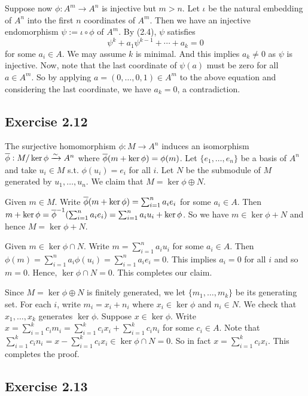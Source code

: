 \documentclass[../A&M.tex]{subfiles}
\begin{document}
Suppose now $\phi : A^m \to A^n$ is injective but $m>n$. Let $\iota$ be the natural embedding of $A^n$ into the first $n$ coordinates of $A^m$. Then we have an injective endomorphism $\psi := \iota \circ \phi$ of $A^m$. By (2.4), $\psi$ satisfies
$$
\psi^k + a_1\psi^{k-1} + \cdots + a_k = 0
$$
for some $a_i\in A$. We may assume $k$ is minimal. And this implies $a_k \neq 0$ as $\psi$ is injective. Now, note that the last coordinate of $\psi(a)$ must be zero for all $a\in A^m$. So by applying $a=(0,\ldots,0,1) \in A^m$ to the above equation and considering the last coordinate, we have $a_k = 0$, a contradiction.

\subsection*{Exercise 2.12}

The surjective homomorphism $\phi: M\to A^n$ induces an isomorphism $\overline{\phi}: M/\ker \phi \xrightarrow{\sim} A^n$ where $\overline{\phi}(m+\ker\phi) = \phi(m)$. Let $\{e_1,\ldots,e_n\}$ be a basis of $A^n$ and take $u_i\in M$ s.t. $\phi(u_i)=e_i$ for all $i$. Let $N$ be the submodule of $M$ generated by $u_1,\ldots,u_n$. We claim that $M = \ker\phi \oplus N$.

Given $m\in M$. Write $\overline{\phi}(m+\ker\phi) = \sum_{i=1}^n a_ie_i$ for some $a_i\in A$. Then $m+\ker\phi = \overline{\phi}^{-1}(\sum_{i=1}^n a_ie_i) = \sum_{i=1}^n a_iu_i + \ker\phi$. So we have $m \in \ker\phi + N$ and hence $M = \ker\phi + N$.

Given $m \in \ker\phi \cap N$. Write $m = \sum_{i=1}^n a_iu_i$ for some $a_i\in A$. Then $\phi(m) = \sum_{i=1}^n a_i \phi(u_i) =  \sum_{i=1}^n a_i e_i = 0$. This implies $a_i=0$ for all $i$ and so $m=0$. Hence, $\ker\phi \cap N=0$. This completes our claim.

Since $M = \ker\phi \oplus N$ is finitely generated, we let $\{m_1,\ldots,m_k\}$ be its generating set. For each $i$, write $m_i = x_i + n_i$ where $x_i\in\ker\phi$ and $n_i \in N$. We check that $x_1,\ldots,x_k$ generates $\ker\phi$. Suppose $x\in \ker\phi$. Write $x = \sum_{i=1}^k c_im_i = \sum_{i=1}^k c_ix_i + \sum_{i=1}^k c_in_i$ for some $c_i \in A$. Note that $\sum_{i=1}^k c_in_i = x - \sum_{i=1}^k c_ix_i \in \ker\phi \cap N = 0$. So in fact $x = \sum_{i=1}^k c_ix_i$. This completes the proof.

\subsection*{Exercise 2.13}
\end{document}
